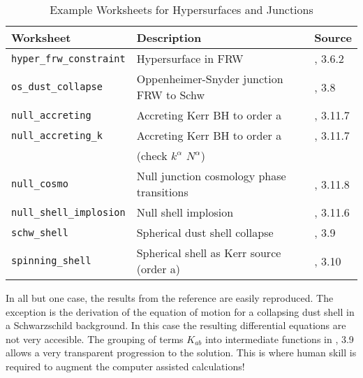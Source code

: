 \documentclass{article}
\begin{document}
\renewcommand{\arraystretch}{1.5}
\begin{table}[h]
  \begin{center}
    \begin{tabular}{lll}\hline\hline
      \textbf{Worksheet} & \textbf{Description} & Source \\ \hline
   \texttt{hyper\_frw\_constraint} & Hypersurface in FRW &  \cite{poisson:2004}, 3.6.2 \\
    \texttt{os\_dust\_collapse} & Oppenheimer-Snyder junction FRW to Schw & \cite{poisson:2004}, 3.8 \\
   \texttt{null\_accreting} & Accreting Kerr BH to order a &  \cite{poisson:2004}, 3.11.7 \\
   \texttt{null\_accreting\_k} & Accreting Kerr BH to order a &  \cite{poisson:2004}, 3.11.7 \\
    & (check $k^\alpha$ $N^\alpha$) &  \\
    \texttt{null\_cosmo} & Null junction cosmology phase transitions &  \cite{poisson:2004}, 3.11.8 \\
    \texttt{null\_shell\_implosion} & Null shell implosion &  \cite{poisson:2004}, 3.11.6 \\
    \texttt{schw\_shell} & Spherical dust shell collapse &  \cite{poisson:2004}, 3.9 \\
    \texttt{spinning\_shell} & Spherical shell as Kerr source (order a) &  \cite{poisson:2004}, 3.10 \\
     \end{tabular}
    \caption{Example Worksheets for Hypersurfaces and Junctions}
    \label{tab:junc}
  \end{center}
\end{table}

In all but one case, the results from the reference are easily reproduced. The exception is the derivation of the equation of motion for 
a collapsing dust shell in a Schwarzschild background. In this case the resulting differential equations are not very accesible. 
The grouping of terms $K_{ab}$ into intermediate functions in \cite{poisson:2004}, 3.9 allows a very transparent progression to the solution. 
This is where human skill is required to augment the computer assisted calculations!

\vfill


\end{document}
